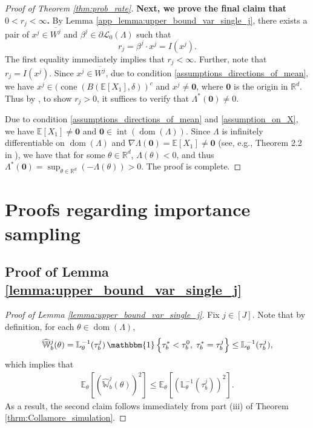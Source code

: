 \documentclass[aap,preprint]{imsart}
\newcommand{\Exp}{{\mathbb{E}}}
\newcommand{\bR}{{\mathbb{R}}}
\theoremstyle{plain}
\theoremstyle{definition}
\begin{document}
\begin{appendix}
\begin{proof}[Proof of Theorem \ref{thm:prob_rate}]
\medskip

\noindent 
\textbf{Next, we prove the final claim that $0 < r_j < \infty$.} By Lemma \ref{app_lemma:upper_bound_var_single_j},  there exists a pair of 
 $x^j \in \overline{W^j}$  and $\beta^j \in \partial \mathcal{L}_0(\Lambda)$ such that 
$$
r_j = \beta^j \cdot x^j = I(x^j).
$$
The first equality immediately implies that $r_j < \infty$. 
Further, note that
$r_j = I(x^j)$. Since $x^j \in \overline{W^j}$, due to condition \eqref{assumptions_directions_of_mean}, we have
$x^j \in (\operatorname{cone}(B(\Exp[X_1],\delta))^c$ and $x^j \neq \textbf{0}$, where $\textbf{0}$ is the origin in $\bR^d$. Thus by \citet[Lemma 3.5]{collamore_thesis}, to show $r_j > 0$, it suffices to verify that $\Lambda^*(\textbf{0}) \neq 0$.

Due to condition \eqref{assumptions_directions_of_mean} and \eqref{assumption_on_X}, we have $\Exp[X_1] \neq \textbf{0}$ and $\textbf{0} \in \operatorname{int}(\operatorname{dom}(\Lambda))$. Since $\Lambda$ is infinitely differentiable on  $\operatorname{dom}(\Lambda)$ and $\nabla \Lambda(\textbf{0}) = \Exp[X_1] \neq \textbf{0}$ (see, e.g., Theorem 2.2 in \cite{brown1986fundamentals}), we have that for some $\theta \in \bR^d$, $\Lambda(\theta) < 0$, and thus $\Lambda^*(\textbf{0}) = \sup_{\theta \in \bR^d} (-\Lambda(\theta)) > 0$.    The proof is complete.
\end{proof}


\section{Proofs regarding importance sampling}

\subsection{Proof of Lemma \ref{lemma:upper_bound_var_single_j}}\label{app:proof_var_single_j}

\begin{proof}[Proof of Lemma \ref{lemma:upper_bound_var_single_j}]
Fix $j \in [J]$. 
Note that by definition, for each $\theta \in \operatorname{dom}(\Lambda)$,
\begin{align*}
    \widehat{\mathbb{W}}_{b}^{j}(\theta)  
= 
\mathbb{L}_{\theta}^{-1}(\tau_b^j) \, \mathbbm{1}\left\{
\tau_b^* < \tau_b^0,\; \tau_b^* = \tau_b^j \right\} \leq \mathbb{L}_{\theta}^{-1}(\tau_b^j),
\end{align*}
which implies that
\begin{align*}
    \Exp_{\theta}\left[ 
\left(\widehat{\mathbb{W}}_{b}^{j}(\theta)\right)^2
\right] \leq
\Exp_{\theta}\left[ 
\left(\mathbb{L}_{\theta}^{-1}(\tau_b^j)\right)^2
\right].
\end{align*}
As a result, the second claim follows immediately from part (iii) of Theorem \ref{thrm:Collamore_simulation}.


\end{proof}
\end{appendix}
\end{document}
